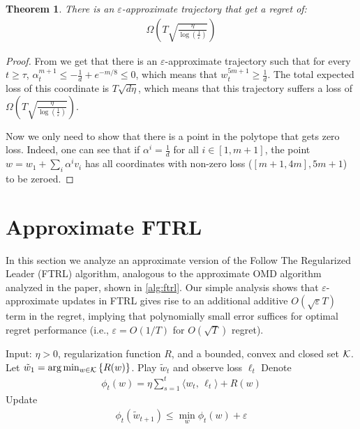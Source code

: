 \documentclass[10pt]{article}
\newtheorem{theorem}{Theorem}
\theoremstyle{definition}
\theoremstyle{remark}
\renewcommand{\epsilon}{\varepsilon}
\newcommand\inprod[2]{\langle #1,\,#2 \rangle}
\newcommand{\roundy}[1]{ {\left( #1 \right)}}
\begin{document}
\begin{theorem}
There is an $\epsilon$-approximate trajectory that get a regret of:
\begin{align*}
    \Omega\roundy{T\sqrt{\frac{\eta}{\log\roundy{\frac{1}{\epsilon}}}}}
\end{align*}
\end{theorem}
\begin{proof}
From  we get that there is an $\epsilon$-approximate trajectory such that for every $t \ge \tau$, $\alpha_t^{m+1} \le -\frac{1}{d} + e^{-m/8} \le 0$, which means that $w_t^{5m+1} \ge \frac{1}{d}$. The total expected loss of this coordinate is $T\sqrt{d\eta}$, which means that this trajectory suffers a loss of $\Omega\roundy{T\sqrt{\frac{\eta}{\log\roundy{\frac{1}{\epsilon}}}}}$.

Now we only need to show that there is a point in the polytope that gets zero loss. Indeed, one can see that if $\alpha^i = \frac{1}{d}$ for all $i\in[1,m+1]$, the point $w=w_1 + \sum_i\alpha^iv_i$ has all coordinates with non-zero loss ($[m+1,4m], 5m+1$) to be zeroed.
\end{proof}

\section{Approximate FTRL}\label{sec:ftrl}

In this section we analyze an approximate version of the Follow The Regularized Leader (FTRL) algorithm, analogous to the approximate OMD algorithm analyzed in the paper, shown in \cref{alg:ftrl}.
Our simple analysis shows that $\epsilon$-approximate updates in FTRL gives rise to an additional additive $O(\sqrt{\epsilon}T)$ term in the regret, implying that polynomially small error suffices for optimal regret performance (i.e., $\epsilon = O(1/T)$ for $O(\sqrt{T})$ regret).

\begin{algorithm}[ht] 
    \caption{Approximate Follow The Regularized Leader} \label{alg:ftrl} 
	\begin{algorithmic}[1]
		\State Input: $\eta > 0$, regularization function ${R}$, and a bounded, convex and closed set $\mathcal K$.
		\State Let $\tilde{w}_1  = \arg\min_{w \in \mathcal K} {\left\{ {R}(w)\right\} }$.
		\State Play $\tilde{w}_t$ and observe loss $\ell_t$
        \State Denote
        \begin{align*}
            \phi_t(w) = \eta\sum_{s=1}^t \inprod{w_t}{\ell_t} + {R}(w)
        \end{align*}
		\State Update
		\begin{align*}
			\phi_t(\tilde{w}_{t+1}) \le \min_w \phi_t(w) + \epsilon
		\end{align*}
		\EndFor
	\end{algorithmic}
\end{algorithm}
\end{document}
